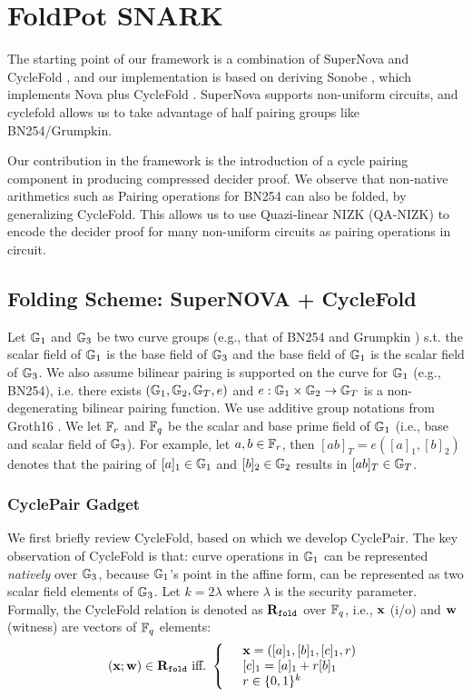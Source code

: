 \section{FoldPot SNARK}
The starting point of our framework 
is a combination of SuperNova \cite{SuperNova} and CycleFold \cite{CycleFold},
and our implementation is based on deriving Sonobe \cite{Sonobe}, which
implements Nova \cite{Nova} plus CycleFold \cite{CycleFold}.
SuperNova supports non-uniform circuits, and
cyclefold allows us to take advantage of half pairing groups
like BN254/Grumpkin.

Our contribution in the framework is the introduction of a 
cycle pairing component in producing compressed decider proof.
We observe that non-native arithmetics such as Pairing operations for
BN254 can also be folded, by generalizing CycleFold.
This allows us to use Quazi-linear NIZK (QA-NIZK) \cite{Gonzalez15,LegoSnark}
to encode the decider proof for many non-uniform circuits as pairing
operations in circuit.

\subsection{Folding Scheme: SuperNOVA + CycleFold}
Let ${\mathbb{G}}_1$ and ${\mathbb{G}}_3$ be two curve groups (e.g., that of
BN254 \cite{BN254} and Grumpkin \cite{Grumpkin}) s.t. the scalar field
of ${\mathbb{G}}_1$ is the base field of ${\mathbb{G}}_3$ and 
the base field of ${\mathbb{G}}_1$ is the scalar field of ${\mathbb{G}}_3$.
We also assume bilinear pairing is supported on the curve 
for ${\mathbb{G}}_1$ (e.g., BN254), i.e.  there exists 
$({\mathbb{G}}_1, {\mathbb{G}}_2, {\mathbb{G}}_T, e)$ and 
$e: {\mathbb{G}}_1 \times {\mathbb{G}}_2 \rightarrow {\mathbb{G}}_T$
is a non-degenerating bilinear pairing function.
We use additive group notations
from Groth16 \cite{Groth16}. 
We let $\mathbb{F}_r$ and $\mathbb{F}_q$ be the scalar and base prime
field of ${\mathbb{G}}_1$ (i.e., base and scalar field of ${\mathbb{G}}_3$).
For example, let $a,b \in \mathbb{F}_r$, then
$[ab]_T = e([a]_1, [b]_2)$ denotes that the pairing
of $[a]_1 \in {\mathbb{G}}_1$ and $[b]_2 \in {\mathbb{G}}_2$ results in
$[ab]_T \in {\mathbb{G}}_T$.

\subsubsection{CyclePair Gadget} 
\label{sec:cyclepair}
We first briefly review
CycleFold, based on which we develop CyclePair.
The key observation of CycleFold is that: 
curve operations in ${\mathbb{G}}_1$ can be represented {\em natively}
over ${\mathbb{G}}_3$, because ${\mathbb{G}}_1$'s point in the affine form,
can be represented as two scalar field elements of ${\mathbb{G}}_3$.
Let $k = 2\lambda$ where $\lambda$ is the security parameter.
Formally, the CycleFold relation is denoted as
$\mathbf{R}_\texttt{fold}$ over $\mathbb{F}_q$, i.e., ${{\mathbf {x}}}$ (i/o) and ${{\mathbf {w}}}$ (witness)
are vectors of $\mathbb{F}_q$ elements:
\[
	({{\mathbf {x}}}; {{\mathbf {w}}}) \in \mathbf{R}_\texttt{fold} ~\textrm{iff.}~
	\left\{
	\begin{array} {l l}
		& {{\mathbf {x}}} = ([a]_1, [b]_1, [c]_1, r)  \\
		& [c]_1 = [a]_1 + r [b]_1 \\
		& r \in \{0,1\}^k \\
	\end{array}
	\right.
\]

